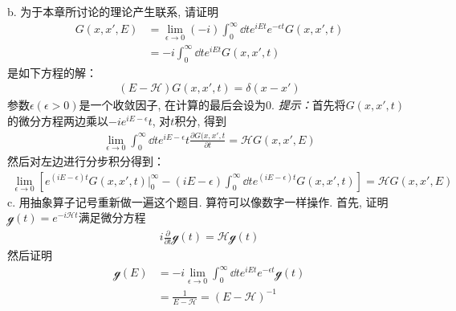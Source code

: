{\noindent b. 为于本章所讨论的理论产生联系, 请证明
\begin{align*}
G(x,x',E) & = \lim_{\epsilon\to0}(-i) \int_0^\infty\dd t e^{iEt}e^{-\epsilon t} G(x,x',t)\\
          & = -i \int_{0}^{\infty}\dd t e^{iEt}G(x,x',t)
\end{align*}
是如下方程的解：
\begin{align*}
(E-\mathscr{H})G(x,x',t) = \delta(x - x')
\end{align*}
参数$\epsilon(\epsilon>0)$是一个收敛因子, 在计算的最后会设为$0$. \textit{提示：}首先将$G(x,x',t)$的微分方程两边乘以$-ie^{iE-\epsilon}t$, 对$t$积分, 得到
\begin{align*}
\lim\limits_{\epsilon\to 0} \int_0^\infty\dd t e^{iE-\epsilon}t \frac{\partial G(x,x',t}{\partial t} = \mathscr{H} G(x,x',E)
\end{align*}
然后对左边进行分步积分得到：
\begin{align*}
\lim\limits_{\epsilon\to 0} \left[ e^{(iE-\epsilon)t}G(x,x',t)\Big|_0^\infty - (iE-\epsilon)\int_{0}^{\infty}\dd t e^{(iE-\epsilon)t}G(x,x',t) \right] = \mathscr{H} G(x,x',E)
\end{align*}
\noindent c. 用抽象算子记号重新做一遍这个题目. 算符可以像数字一样操作. 首先, 证明$\mathscr{g}(t) = e^{-i\mathscr{H}t}$满足微分方程
\begin{align*}
i\frac{\partial}{\partial t}\mathscr{g}(t) = \mathscr{Hg}(t)
\end{align*}
然后证明
\begin{align*}
\mathscr{g}(E) &= -i\lim\limits_{\epsilon\to 0}\int_{0}^{\infty} \dd t e^{iEt} e^{-\epsilon t}\mathscr{g}(t)\\
             & = \frac{1}{E-\mathscr{H}} = (E-\mathscr{H})^{-1}
\end{align*}
}

